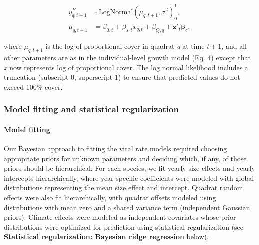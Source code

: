 \documentclass[12pt,]{article}
\let\oldparagraph\paragraph
\renewcommand{\paragraph}[1]{\oldparagraph{#1}\mbox{}}
\begin{document}
\vspace{-3em}\begin{align}
y_{q,t+1}^{P} &\sim \text{LogNormal}(\mu_{q,t+1}, \sigma^2)_{0}^{1}, \\
\mu_{q,t+1} &= \beta_{0,t} + \beta_{s,t}x_{q,t} + \beta_{Q,q} + \textbf{z}'_t \boldsymbol{\beta}_c,
\end{align}\vspace{-3em}

where \(\mu_{q,t+1}\) is the log of proportional cover in quadrat
\emph{q} at time \(t+1\), and all other parameters are as in the
individual-level growth model (Eq. 4) except that \emph{x} now
represents log of proportional cover. The log normal likelihood includes
a truncation (subscript 0, superscript 1) to ensure that predicted
values do not exceed 100\% cover.

\subsubsection{Model fitting and statistical
regularization}\label{model-fitting-and-statistical-regularization}

\paragraph{Model fitting}\label{model-fitting}

Our Bayesian approach to fitting the vital rate models required choosing
appropriate priors for unknown parameters and deciding which, if any, of
those priors should be hierarchical. For each species, we fit yearly
size effects and yearly intercepts hierarchically, where year-specific
coefficients were modeled with global distributions representing the
mean size effect and intercept. Quadrat random effects were also fit
hierarchically, with quadrat offsets modeled using distributions with
mean zero and a shared variance term (independent Gaussian priors).
Climate effects were modeled as independent covariates whose prior
distributions were optimized for prediction using statistical
regularization (see \textbf{Statistical regularization: Bayesian ridge
regression} below).
\end{document}
